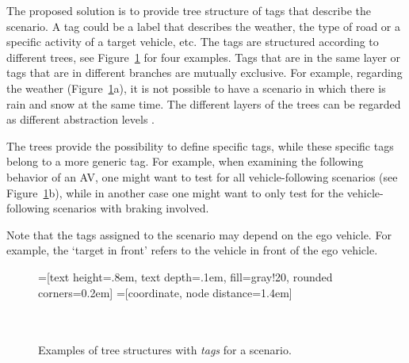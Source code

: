 The proposed solution is to provide tree structure of tags that describe the scenario. A tag could be a label that describes the weather, the type of road or a specific activity of a target vehicle, etc. The tags are structured according to different trees, see Figure~\ref{fig:tag trees} for four examples. Tags that are in the same layer or tags that are in different branches are mutually exclusive. For example, regarding the weather (Figure~\ref{fig:tag trees}a), it is not possible to have a scenario in which there is rain and snow at the same time. The different layers of the trees can be regarded as different abstraction levels \cite{Bonnin2014}. 

The trees provide the possibility to define specific tags, while these specific tags belong to a more generic tag. For example, when examining the following behavior of an AV, one might want to test for all vehicle-following scenarios (see Figure~\ref{fig:tag trees}b), while in another case one might want to only test for the vehicle-following scenarios with braking involved.

Note that the tags assigned to the scenario may depend on the ego vehicle. For example, the `target in front' refers to the vehicle in front of the ego vehicle.

\begin{figure}
	\begin{center}
		=[text height=.8em, text depth=.1em, fill=gray!20, rounded corners=0.2em]
		=[coordinate, node distance=1.4em]
		 \\
		\\
		 \\
		\caption{Examples of tree structures with \emph{tags} for a scenario.}
		\label{fig:tag trees}
	\end{center}
\end{figure}
